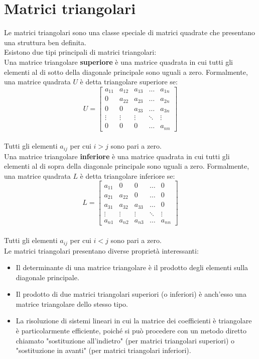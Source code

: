 \section{Matrici triangolari}
	Le matrici triangolari sono una classe speciale di matrici quadrate che presentano una struttura ben definita.
	\leavevmode\\
	Esistono due tipi principali di matrici triangolari:
	\leavevmode\\
	Una matrice triangolare \textbf{superiore} è una matrice quadrata in cui tutti gli elementi al di sotto della diagonale principale sono uguali a zero. Formalmente, una matrice quadrata \( U \) è detta triangolare superiore se:
	\leavevmode\\
	\[
	U = \begin{bmatrix}
		a_{11} & a_{12} & a_{13} & \dots & a_{1n} \\
		0 & a_{22} & a_{23} & \dots & a_{2n} \\
		0 & 0 & a_{33} & \dots & a_{3n} \\
		\vdots & \vdots & \vdots & \ddots & \vdots \\
		0 & 0 & 0 & \dots & a_{nn}
	\end{bmatrix}
	\]
	\leavevmode\\
	Tutti gli elementi \( a_{ij} \) per cui \( i > j \) sono pari a zero.
	\leavevmode\\
	Una matrice triangolare \textbf{inferiore} è una matrice quadrata in cui tutti gli elementi al di sopra della diagonale principale sono uguali a zero. Formalmente, una matrice quadrata \( L \) è detta triangolare inferiore se:
	\leavevmode\\
	\[
	L = \begin{bmatrix}
		a_{11} & 0 & 0 & \dots & 0 \\
		a_{21} & a_{22} & 0 & \dots & 0 \\
		a_{31} & a_{32} & a_{33} & \dots & 0 \\
		\vdots & \vdots & \vdots & \ddots & \vdots \\
		a_{n1} & a_{n2} & a_{n3} & \dots & a_{nn}
	\end{bmatrix}
	\]
	\leavevmode\\
	Tutti gli elementi \( a_{ij} \) per cui \( i < j \) sono pari a zero.
	\leavevmode\\
	Le matrici triangolari presentano diverse proprietà interessanti:
	\begin{itemize}
		\item Il determinante di una matrice triangolare è il prodotto degli elementi sulla diagonale principale.
		\item Il prodotto di due matrici triangolari superiori (o inferiori) è anch'esso una matrice triangolare dello stesso tipo.
		\item La risoluzione di sistemi lineari in cui la matrice dei coefficienti è triangolare è particolarmente efficiente, poiché si può procedere con un metodo diretto chiamato "sostituzione all'indietro" (per matrici triangolari superiori) o "sostituzione in avanti" (per matrici triangolari inferiori).
	\end{itemize}
